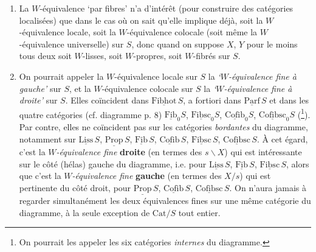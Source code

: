 \documentclass[11pt]{article}
\newcommand{\msp}[1]{\marginpar{\footnotesize [#1]}}
\newcommand{\uc}[1]{\underline{\mathrm{#1}}}
\newcommand{\Cat}{\mathrm{Cat}}
\begin{document}
\begin{enumerate}[leftmargin=*]
\item[1)] La $W$-équivalence `par fibres' n'a d'intérêt (pour construire des catégories localisées) que dans le cas où on sait qu'elle implique déjà, soit la $W$-équivalence locale, soit la $W$-équivalence colocale (soit même la $W$-équivalence universelle) sur $S$, donc quand on suppose $X$, $Y$ pour le moins tous deux soit $W$-lisses, soit $W$-propres, soit $W$-fibrés sur $S$.

\item[2)] On pourrait appeler la $W$-équivalence locale sur $S$ la \textit{`$W$-équivalence fine à gauche'} sur $S$, et la $W$-équivalence colocale sur $S$ la \textit{`$W$-équivalence fine à droite'} sur $S$. Elles coïncident dans $\uc{Fibhot}\,S$, a fortiori dans $\uc{Parf}\,S$ et dans les quatre catégories (cf. diagramme p. 8) $\uc{Fib}_0S$, $\uc{Fibsc}_0S$, $\uc{Cofib}_0S$, $\uc{Cofibsc}_0S$ (\footnote[33]{On pourrait les appeler les six catégories \textit{internes} du diagramme.}). Par contre, elles ne coïncident pas sur les catégories \textit{bordantes} du diagramme, notamment sur $\uc{Liss}\,S$, $\uc{Prop}\,S$, $\uc{Fib}\,S$, $\uc{Cofib}\,S$, $\uc{Fibsc}\,S$, $\uc{Cofibsc}\,S$. À cet égard, c'est la \textit{$W$-équivalence fine} \textbf{droite} (en termes des $s\backslash X$) qui est intéressante sur le côté (hélas) gauche du diagramme, i.e. pour $\uc{Liss}\,S$, $\uc{Fib}\,S$, $\uc{Fibsc}\,S$, alors que c'est la \textit{$W$-équivalence fine} \textbf{gauche} (en termes des $X/s$) qui est pertinente du côté droit, pour $\uc{Prop}\,S$, $\uc{Cofib}\,S$, $\uc{Cofibsc}\,S$. On n'aura jamais à regarder simultanément les deux équivalences fines sur une même catégorie du diagramme, à la seule exception de $\Cat/S$ tout entier.
\end{enumerate}

\msp{page 47}
\end{document}

